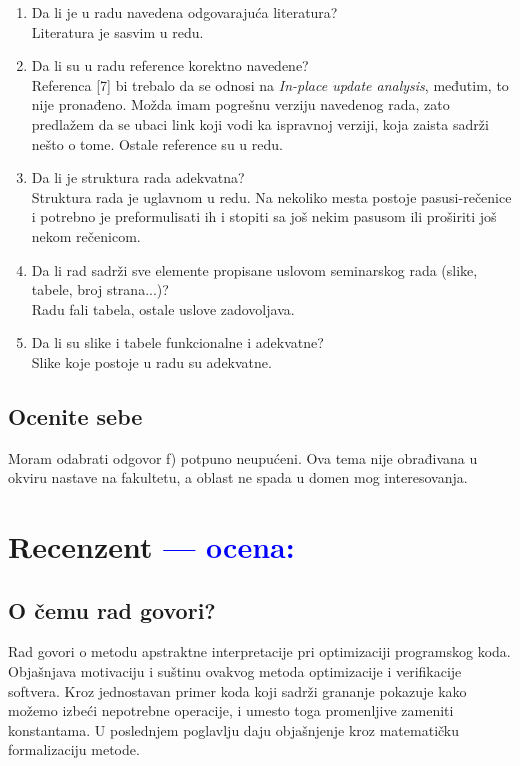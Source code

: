 \documentclass[a4paper]{report}
\newcommand{\odgovor}[1]{\textcolor{blue}{#1}}
\begin{document}
\begin{enumerate}
\item Da li je u radu navedena odgovarajuća literatura?\\
	\noindent Literatura je sasvim u redu.

\item Da li su u radu reference korektno navedene?\\
	\noindent Referenca [7] bi trebalo da se odnosi na \textit{In-place update analysis}, međutim, to nije pronađeno. Možda imam pogrešnu verziju navedenog rada, zato predlažem da se ubaci link koji vodi ka ispravnoj verziji, koja zaista sadrži nešto o tome. Ostale reference su u redu.

\item Da li je struktura rada adekvatna?\\
	\noindent Struktura rada je uglavnom u redu. Na nekoliko mesta postoje pasusi-rečenice i potrebno je preformulisati ih i stopiti sa još nekim pasusom ili proširiti još nekom rečenicom.

\item Da li rad sadrži sve elemente propisane uslovom seminarskog rada (slike, tabele, broj strana...)?\\
	\noindent Radu fali tabela, ostale uslove zadovoljava.

\item Da li su slike i tabele funkcionalne i adekvatne?\\
	\noindent Slike koje postoje u radu su adekvatne.

\end{enumerate}

\section{Ocenite sebe}

Moram odabrati odgovor f) potpuno neupućeni. Ova tema nije obrađivana u okviru nastave na fakultetu, a oblast ne spada u domen mog interesovanja.

\chapter{Recenzent \odgovor{--- ocena:} }


\section{O čemu rad govori?}
Rad govori o metodu apstraktne interpretacije pri optimizaciji programskog koda. Objašnjava motivaciju i suštinu ovakvog metoda optimizacije i verifikacije softvera. 
Kroz jednostavan primer koda koji sadrži grananje pokazuje kako možemo izbeći nepotrebne operacije, i umesto toga promenljive zameniti konstantama. 
U poslednjem poglavlju daju objašnjenje kroz matematičku formalizaciju metode.
\end{document}
